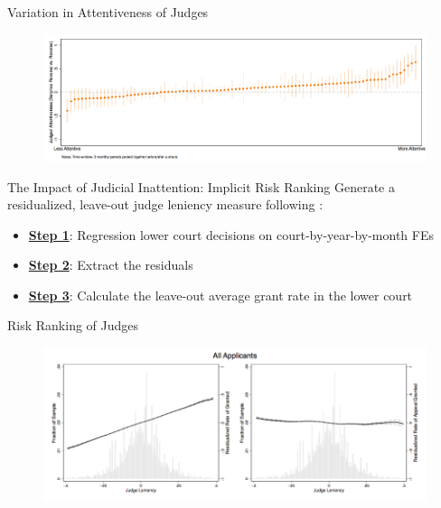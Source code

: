\begin{frame}{Variation in Attentiveness of Judges}
    \begin{figure}
        \centering
        \includegraphics[height = 0.6 \textheight]{images/surp_reverse.png}
    \end{figure}
\end{frame}

\begin{frame}{The Impact of Judicial Inattention: Implicit Risk Ranking}
    Generate a residualized, leave-out judge leniency measure following \citet{arnold2018racial}:
    \begin{itemize}
        \item<2-> \textbf{\color{goldenrod}\underline{Step 1}}: Regression lower court decisions on court-by-year-by-month FEs
        \item<3-> \textbf{\color{goldenrod}\underline{Step 2}}: Extract the residuals
        \item<4-> \textbf{\color{goldenrod}\underline{Step 3}}: Calculate the leave-out average grant rate in the lower court
    \end{itemize}
\end{frame}

\begin{frame}{Risk Ranking of Judges}
    \begin{figure}
        \centering
        \includegraphics[height = 0.6 \textheight]{images/complete_full.png}
    \end{figure}
\end{frame}

